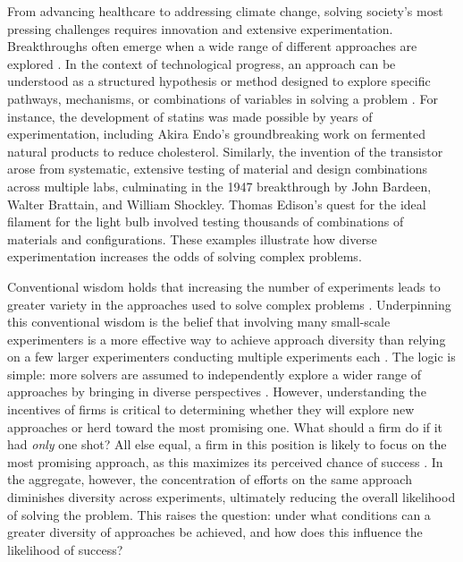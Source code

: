 


From advancing healthcare to addressing climate change, solving society's most pressing challenges requires innovation and extensive experimentation. Breakthroughs often emerge when a wide range of different approaches are explored \citep{gross2023world}. In the context of technological progress, an approach can be understood as a structured hypothesis or method designed to explore specific pathways, mechanisms, or combinations of variables in solving a problem \citep{sorenson2024theory}. For instance, the development of statins was made possible by years of experimentation, including Akira Endo's groundbreaking work on fermented natural products to reduce cholesterol. Similarly, the invention of the transistor arose from systematic, extensive testing of material and design combinations across multiple labs, culminating in the 1947 breakthrough by John Bardeen, Walter Brattain, and William Shockley. Thomas Edison’s quest for the ideal filament for the light bulb involved testing thousands of combinations of materials and configurations. These examples illustrate how diverse experimentation increases the odds of solving complex problems.

Conventional wisdom holds that increasing the number of experiments leads to greater variety in the approaches used to solve complex problems \citep{prager2021seek, hong2004groups}. Underpinning this conventional wisdom is the belief that involving many small-scale experimenters is a more effective way to achieve approach diversity than relying on a few larger experimenters conducting multiple experiments each \citep{cohen1992tradeoff}. The logic is simple: more solvers are assumed to independently explore a wider range of approaches by bringing in diverse perspectives \citep{thomke1998modes}. However, understanding the incentives of firms is critical to determining whether they will explore new approaches or herd toward the most promising one. What should a firm do if it had \textit{only} one shot? All else equal, a firm in this position is likely to focus on the most promising approach, as this maximizes its perceived chance of success \citep{bikhchandani1992theory}.  In the aggregate, however, the concentration of efforts on the same approach diminishes diversity across experiments, ultimately reducing the overall likelihood of solving the problem. This raises the question: under what conditions can a greater diversity of approaches be achieved, and how does this influence the likelihood of success?

